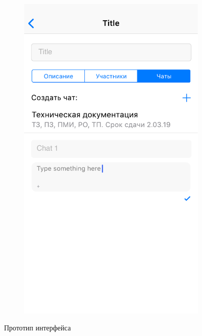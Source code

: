 \documentclass[a4paper,12pt,reqno]{article}
\begin{document}
\begin{figure}[h!]
\begin{subfigure}[b]{0.3\linewidth}
			\includegraphics[width=\linewidth]{../includes/prototype/8.pdf}
		\end{subfigure}
		\caption{Прототип интерфейса}
	\end{figure}

	\newpage
	
						\newpage
						
\end{document}
